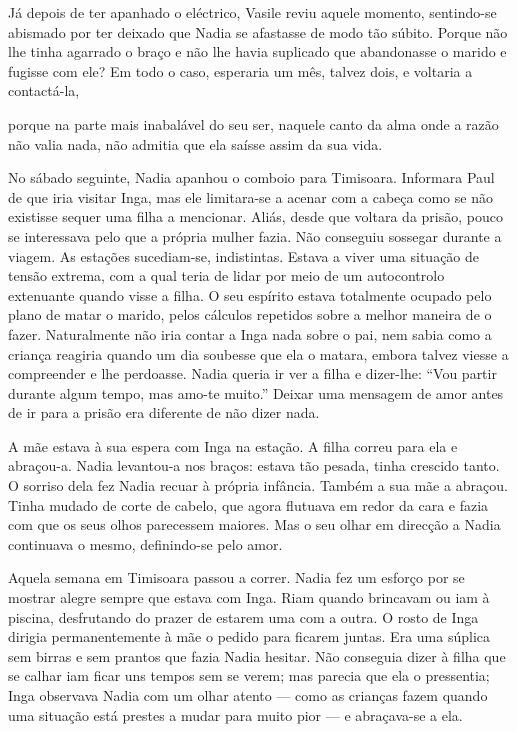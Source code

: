 Já depois de ter apanhado o eléctrico, Vasile reviu aquele momento,
sentindo-se abismado por ter deixado que Nadia se afastasse de modo tão
súbito. Porque não lhe tinha agarrado o braço e não lhe havia suplicado
que abandonasse o marido e fugisse com ele? Em todo o caso, esperaria um
mês, talvez dois, e voltaria a contactá-la,

porque na parte mais inabalável do seu ser, naquele canto da alma onde a
razão não valia nada, não admitia que ela saísse assim da sua vida.

No sábado seguinte, Nadia apanhou o comboio para Timisoara. Informara
Paul de que iria visitar Inga, mas ele limitara-se a acenar com a cabeça
como se não existisse sequer uma filha a mencionar. Aliás, desde que
voltara da prisão, pouco se interessava pelo que a própria mulher fazia.
Não conseguiu sossegar durante a viagem. As estações sucediam-se,
indistintas. Estava a viver uma situação de tensão extrema, com a qual
teria de lidar por meio de um autocontrolo extenuante quando visse a
filha. O seu espírito estava totalmente ocupado pelo plano de matar o
marido, pelos cálculos repetidos sobre a melhor maneira de o fazer.
Naturalmente não iria contar a Inga nada sobre o pai, nem sabia como a
criança reagiria quando um dia soubesse que ela o matara, embora talvez
viesse a compreender e lhe perdoasse. Nadia queria ir ver a filha e
dizer-lhe: ``Vou partir durante algum tempo, mas amo-te muito.'' Deixar
uma mensagem de amor antes de ir para a
prisão era diferente de não dizer nada.

A mãe estava à sua espera com Inga na estação. A filha correu para ela e
abraçou-a. Nadia levantou-a nos braços: estava tão pesada, tinha
crescido tanto. O sorriso dela fez Nadia recuar à própria infância.
Também a sua mãe a abraçou. Tinha mudado de corte de cabelo, que agora
flutuava em redor da cara e fazia com que os seus olhos parecessem
maiores. Mas o seu olhar em direcção a Nadia continuava o mesmo,
definindo-se pelo amor.

Aquela semana em Timisoara passou a correr. Nadia fez um esforço por se
mostrar alegre sempre que estava com Inga. Riam quando brincavam ou iam
à piscina, desfrutando do prazer de estarem uma com a outra. O rosto
de Inga dirigia permanentemente à mãe o pedido para ficarem juntas.
Era uma súplica sem birras e sem prantos que fazia Nadia hesitar. Não
conseguia dizer à filha que se calhar iam ficar uns tempos sem se verem;
mas parecia que ela o pressentia; Inga observava Nadia com um olhar
atento --- como as crianças fazem quando uma situação está prestes a
mudar para muito pior --- e abraçava-se a ela.

